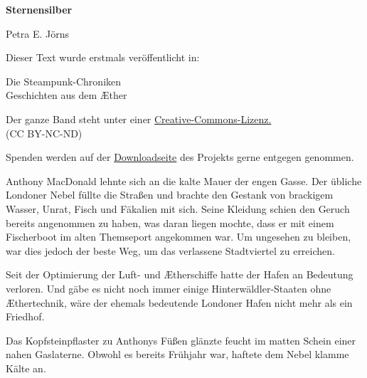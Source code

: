\usepackage[ngerman]{babel}
\usepackage[T1]{fontenc}




\newcommand\bigpar\medskip


\raggedbottom
\begin{center}
\textbf{\huge\textsf{Sternensilber}}

\medskip
Petra E. Jörns

\end{center}

\bigskip
\begin{flushleft}
Dieser Text wurde erstmals veröffentlicht in:
\begin{center}
Die Steampunk-Chroniken\\
Geschichten aus dem Æther
\end{center}

\bigskip

Der ganze Band steht unter einer 
\href{http://creativecommons.org/licenses/by-nc-nd/2.0/de/}{Creative-Commons-Lizenz.} \\ 
(CC BY-NC-ND)

\bigskip

Spenden werden auf der 
\href{http://steampunk-chroniken.de/download}{Downloadseite}
des Projekts gerne entgegen genommen. 
\end{flushleft}

\newpage


Anthony MacDonald lehnte sich an die kalte Mauer der engen Gasse.
Der übliche Londoner Nebel füllte die Straßen und brachte den
Gestank von brackigem Wasser, Unrat, Fisch und Fäkalien mit sich.
Seine Kleidung schien den Geruch bereits angenommen zu haben, was
daran liegen mochte, dass er mit einem Fischerboot im alten
Themseport angekommen war. Um ungesehen zu bleiben, war dies jedoch
der beste Weg, um das verlassene Stadtviertel zu erreichen.

Seit der Optimierung der Luft- und Ætherschiffe hatte der Hafen an
Bedeutung verloren. Und gäbe es nicht noch immer einige
Hinterwäldler-Staaten ohne Æthertechnik, wäre der ehemals
bedeutende Londoner Hafen nicht mehr als ein Friedhof.

Das Kopfsteinpflaster zu Anthonys Füßen glänzte feucht im matten
Schein einer nahen Gaslaterne. Obwohl es bereits Frühjahr war,
haftete dem Nebel klamme Kälte an.

